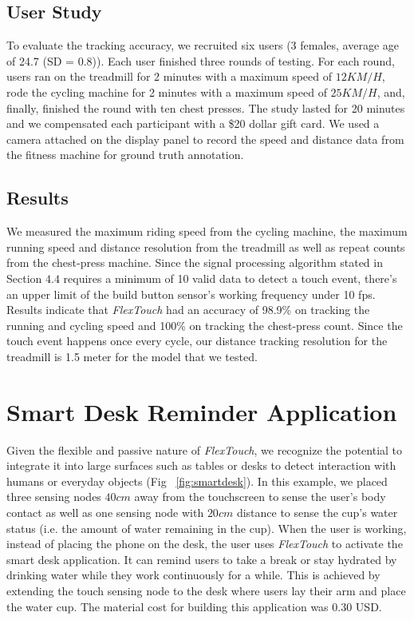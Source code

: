 \subsection{User Study}
To evaluate the tracking accuracy, we recruited six users (3 females, average age of 24.7 (SD = 0.8)). Each user finished three rounds of testing. For each round, users ran on the treadmill for 2 minutes with a maximum speed of $12KM/H$, rode the cycling machine for 2 minutes with a maximum speed of $25KM/H$, and, finally, finished the round with ten chest presses. The study lasted for 20 minutes and we compensated each participant with a \$20 dollar gift card. We used a camera attached on the display panel to record the speed and distance data from the fitness machine for ground truth annotation.

\subsection{Results}
We measured the maximum riding speed from the cycling machine, the maximum running speed and distance resolution from the treadmill as well as repeat counts from the chest-press machine. Since the signal processing algorithm stated in Section $4.4$ requires a minimum of 10 valid data to detect a touch event, there's an upper limit of the build button sensor's working frequency under 10 fps. Results indicate that \textit{FlexTouch} had an accuracy of 98.9\% on tracking the running and cycling speed and 100\% on tracking the chest-press count. Since the touch event happens once every cycle, our distance tracking resolution for the treadmill is 1.5 meter for the model that we tested.

\section{Smart Desk Reminder Application}
Given the flexible and passive nature of \textit{FlexTouch}, we recognize the potential to integrate it into large surfaces such as tables or desks to detect interaction with humans or everyday objects (Fig ~\ref{fig:smartdesk}). In this example, we placed three sensing nodes $40 cm$ away from the touchscreen to sense the user's body contact as well as one sensing node with $20 cm$ distance to sense the cup's water status (i.e. the amount of water remaining in the cup). When the user is working, instead of placing the phone on the desk, the user uses \textit{FlexTouch} to activate the smart desk application. It can remind users to take a break or stay hydrated by drinking water while they work continuously for a while. This is achieved by extending the touch sensing node to the desk where users lay their arm and place the water cup. The material cost for building this application was 0.30 USD.



